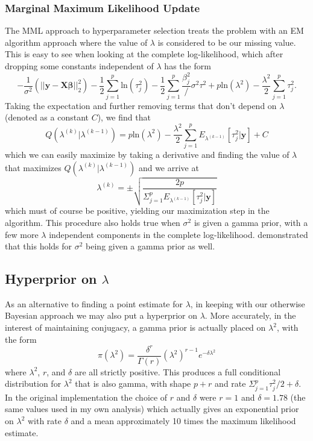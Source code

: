 \documentclass{uwstat572}
\begin{document}
\subsubsection{Marginal Maximum Likelihood Update}
The MML approach to hyperparameter selection treats the problem with an EM algorithm approach where the value of $\lambda$ is considered to be our missing value. This is easy to see when looking at the complete log-likelihood, which after dropping some constants independent of $\lambda$ has the form \[
-\frac{1}{\sigma^2}(||\mathbf{y}-\mathbf{X}\boldsymbol\beta||^2_2)-\frac{1}{2}\sum^p_{j=1}\text{ln}(\tau_j^2)-\frac{1}{2}\sum^p_{j=1}\frac{\beta^2_j}/\sigma^2\tau^2+p\text{ln}(\lambda^2)-\frac{\lambda^2}{2}\sum^p_{j=1}\tau^2_j.
\] Taking the expectation and further removing terms that don't depend on $\lambda$ (denoted as a constant $C$), we find that \[
Q(\lambda^{(k)}|\lambda^{(k-1)})=p\text{ln}(\lambda^2)-\frac{\lambda^2}{2}\sum^p_{j=1}E_{\lambda^{(k-1)}}[\tau^2_j|\mathbf{y}]+C
\] which we can easily maximize by taking a derivative and finding the value of $\lambda$ that maximizes $Q(\lambda^{(k)}|\lambda^{(k-1)})$ and we arrive at 
\[
\lambda^{(k)}=\pm\sqrt{\frac{2p}{\Sigma^p_{j=1}E_{\lambda^{(k-1)}}[\tau^2_j|\mathbf{y}]}}
\] which must of course be positive, yielding our maximization step in the algorithm. This procedure also holds true when $\sigma^2$ is given a gamma prior, with a few more $\lambda$ independent components in the complete log-likelihood. \cite{park2008bayesian} demonstrated that this holds for $\sigma^2$ being given a gamma prior as well.

\subsection{Hyperprior on $\lambda$}
As an alternative to finding a point estimate for $\lambda$, in keeping with our otherwise Bayesian approach we may also put a hyperprior on $\lambda$. More accurately, in the interest of maintaining conjugacy, a gamma prior is actually placed on $\lambda^2$, with the form\[
\pi(\lambda^2)=\frac{\delta^r}{\Gamma(r)}(\lambda^2)^{r-1}e^{-\delta\lambda^2}
\] where $\lambda^2$, $r$, and $\delta$ are all strictly positive. This produces a full conditional distribution for $\lambda^2$ that is also gamma, with shape $p+r$ and rate $\Sigma^p_{j=1}\tau^2_j/2+\delta$. In the original implementation the choice of $r$ and $\delta$ were $r=1$ and $\delta=1.78$ (the same values used in my own analysis) which actually gives an exponential prior on $\lambda^2$ with rate $\delta$ and a mean approximately 10 times the maximum likelihood estimate.
\end{document}

